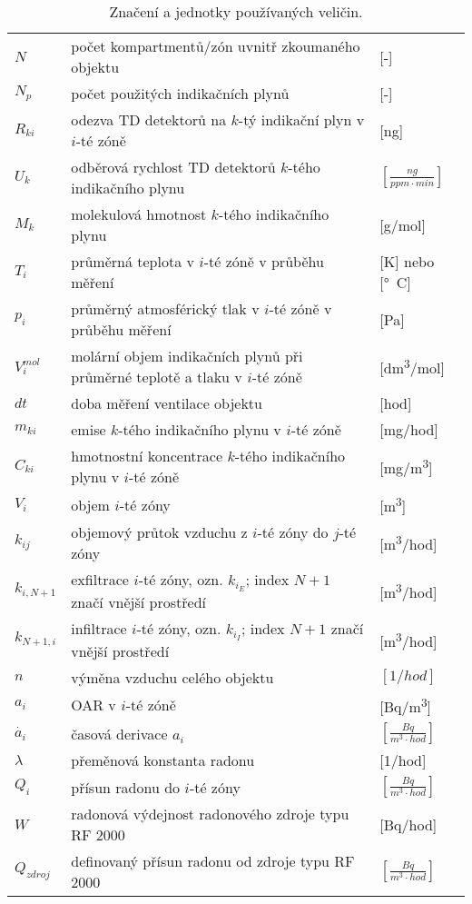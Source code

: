\begin{table}[p]
\def\arraystretch{1.2}
    \centering
    \caption{Značení a jednotky používaných veličin.}
    \label{tab:veliciny}
    \begin{tabular}{lp{}l}
        \toprule
        $N$   & počet kompartmentů/zón uvnitř zkoumaného objektu&[-]\\
        $N_p$ & počet použitých indikačních plynů & [-]\\
        $R_{ki}$ & odezva TD detektorů na $k$-tý indikační plyn v $i$-té zóně &[\si{ng}]\\
        $U_k$ & odběrová rychlost TD detektorů $k$-tého indikačního plynu &$\left[\si{\frac{ng}{ppm\cdot min}}\right]$\\
        $M_{k}$ & molekulová hmotnost $k$-tého indikačního plynu &[\si{g/mol}]\\
        $T_i$ & průměrná teplota v $i$-té zóně v průběhu měření& [K] nebo [\si{\degree C}]\\
        $p_i$ & průměrný atmosférický tlak v $i$-té zóně v průběhu měření& [Pa]\\
        $V_{i}^{mol}$ & molární objem indikačních plynů při průměrné teplotě a tlaku v $i$-té zóně&[\si{dm^3/mol}]\\ 
        $dt$& doba měření ventilace objektu & [hod]\\
        $m_{ki}$ & emise $k$-tého indikačního plynu v $i$-té zóně & [\si{mg/hod}]\\
        $C_{ki}$ & hmotnostní koncentrace $k$-tého indikačního plynu v $i$-té zóně& [\si{mg/m^3}] \\
        $V_i$ & objem $i$-té zóny& [\si{m^3}] \\
        $k_{ij}$ & objemový průtok vzduchu z $i$-té zóny do $j$-té zóny& [\si{m^3/hod}]\\
        $k_{i, N+1}$ & exfiltrace $i$-té zóny, ozn. $k_{i_E}$; index $N+1$ značí vnější prostředí & [\si{m^3/hod}]\\
        $k_{N+1, i}$ & infiltrace $i$-té zóny, ozn. $k_{i_I}$; index $N+1$ značí vnější prostředí &[\si{m^3/hod}]\\
        $n$   & výměna vzduchu celého objektu & $[\si{1/hod}]$\\
        $a_i$ & OAR v $i$-té zóně& [\si{Bq/m^3}] \\
        $\dot{a_i}$ & časová derivace $a_i$ & $\left[\si{\frac{Bq}{m^3\cdot hod}}\right]$ \\
        $\lambda$ & přeměnová konstanta radonu& [\si{1/hod}]\\
        $Q_i$ & přísun radonu do $i$-té zóny& $\left[\si{\frac{Bq}{m^3\cdot hod}}\right]$ \\
        $W$ & radonová výdejnost radonového zdroje typu RF 2000 & [\si{Bq/hod}]\\
        $Q_{zdroj}$ & definovaný přísun radonu od zdroje typu RF 2000& $\left[\si{\frac{Bq}{m^3\cdot hod}}\right]$ \\
        \bottomrule
    \end{tabular}
\end{table}
